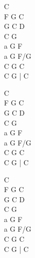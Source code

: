 \begin{chord}
    C\\
    F G C\\
    G C D\\
    C G\\
    a G F\\
    a G F/G\\
    C G C\\
    C G | C

    C\\
    F G C\\
    G C D\\
    C G\\
    a G F\\
    a G F/G\\
    C G C\\
    C G | C

    C\\
    F G C\\
    G C D\\
    C G\\
    a G F\\
    a G F/G\\
    C G C\\
    C G | C
\end{chord}